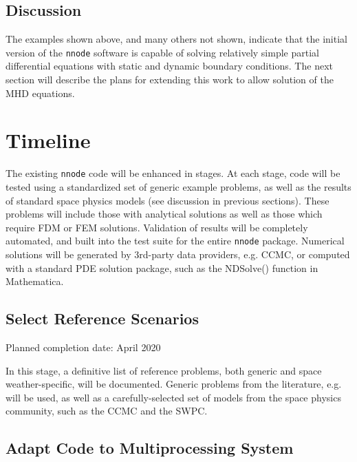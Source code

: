 \documentclass{article}
\begin{document}
\subsection{Discussion}

The examples shown above, and many others not shown, indicate that the initial version of the \texttt{nnode} software is capable of solving relatively simple partial differential equations with static and dynamic boundary conditions. The next section will describe the plans for extending this work to allow solution of the MHD equations.


\newpage

\section{Timeline}

The existing \texttt{nnode} code will be enhanced in stages. At each stage, code will be tested using a standardized set of generic example problems, as well as the results of standard space physics models (see discussion in previous sections). These problems will include those with analytical solutions as well as those which require FDM or FEM solutions. Validation of results will be completely automated, and built into the test suite for the entire \texttt{nnode} package. Numerical solutions will be generated by 3rd-party data providers, e.g. CCMC, or computed with a standard PDE solution package, such as the NDSolve() function in Mathematica.

\subsection{Select Reference Scenarios}

Planned completion date: April 2020

In this stage, a definitive list of reference problems, both generic and space weather-specific, will be documented. Generic problems from the literature, e.g. \cite{Lagaris1998} will be used, as well as a carefully-selected set of models from the space physics community, such as the CCMC and the SWPC.

\subsection{Adapt Code to Multiprocessing System}
\end{document}
